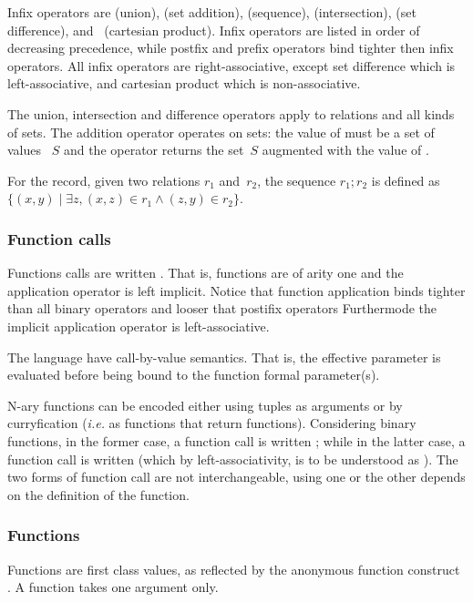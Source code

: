 Infix operators are
\T{|} (union), \T{++} (set addition),
\T{;} (sequence), \T{\&} (intersection), \T{\textbackslash} (set difference),
and~\T{*} (cartesian product).
Infix operators  are listed in order of decreasing precedence,
while  postfix and prefix operators bind tighter then infix operators.
All infix operators are right-associative,
except set difference which is left-associative, and cartesian product
which is non-associative.

The union, intersection and difference operators apply to relations
and all kinds of sets.
The addition operator  operates on
sets: the value of  must be a set of values
~$S$ and the operator returns the set~$S$ augmented with the value of
.

For the record, given two relations $r_1$ and~$r_2$,
the sequence $r_1; r_2$ is defined
as $\{ (x,y) \mid \exists z, (x,z) \in r_1 \wedge (z,y) \in r_2\}$.

\subsubsection*{Function calls}
Functions calls are written .
That is, functions are of arity one and the application operator
is left implicit. Notice that function application binds tighter
than all binary operators and looser that postifix operators
Furthermode the implicit application operator is left-associative.

The \cat{} language have call-by-value semantics. That is,
the effective parameter
 is evaluated before being bound to the
function formal parameter(s).

N-ary functions can be encoded either using tuples as arguments
or by curryfication (\emph{i.e.} as functions that return functions).
Considering binary functions, in the former case,
a function call is written
;
while in the latter case, a function call is written
(which by left-associativity, is to be understood
as ).
The two forms of function call are not interchangeable, using one or the
other depends on the definition of the function.


\subsubsection*{Functions}
Functions are first class values, as reflected by the anonymous
function construct .
A function takes one argument only.

